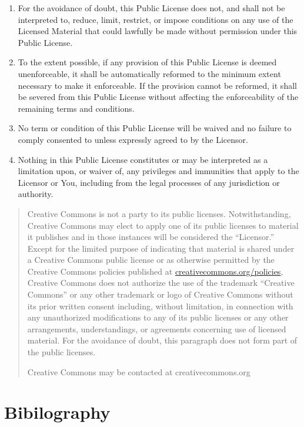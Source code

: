 \documentclass[]{book}
\begin{document}
\begin{enumerate}
\def\labelenumi{\alph{enumi}.}
\item
  For the avoidance of doubt, this Public License does not, and shall
  not be interpreted to, reduce, limit, restrict, or impose conditions
  on any use of the Licensed Material that could lawfully be made
  without permission under this Public License.
\item
  To the extent possible, if any provision of this Public License is
  deemed unenforceable, it shall be automatically reformed to the
  minimum extent necessary to make it enforceable. If the provision
  cannot be reformed, it shall be severed from this Public License
  without affecting the enforceability of the remaining terms and
  conditions.
\item
  No term or condition of this Public License will be waived and no
  failure to comply consented to unless expressly agreed to by the
  Licensor.
\item
  Nothing in this Public License constitutes or may be interpreted as a
  limitation upon, or waiver of, any privileges and immunities that
  apply to the Licensor or You, including from the legal processes of
  any jurisdiction or authority.
\end{enumerate}

\begin{quote}
Creative Commons is not a party to its public licenses. Notwithstanding,
Creative Commons may elect to apply one of its public licenses to
material it publishes and in those instances will be considered the
``Licensor.'' Except for the limited purpose of indicating that material
is shared under a Creative Commons public license or as otherwise
permitted by the Creative Commons policies published at
\href{http://creativecommons.org/policies}{creativecommons.org/policies},
Creative Commons does not authorize the use of the trademark ``Creative
Commons'' or any other trademark or logo of Creative Commons without its
prior written consent including, without limitation, in connection with
any unauthorized modifications to any of its public licenses or any
other arrangements, understandings, or agreements concerning use of
licensed material. For the avoidance of doubt, this paragraph does not
form part of the public licenses.

Creative Commons may be contacted at creativecommons.org
\end{quote}

\chapter{Bibilography}\label{bibilography}


\end{document}
